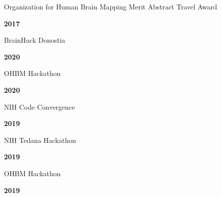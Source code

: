 \documentclass[10pt]{article}
\newcommand{\sectionstyle}{\LARGE \fontfamily{lmr}\selectfont}
\begin{document}
\begin{minipage}[t]{.85\linewidth}
\flushleft
\noindent
Organization for Human Brain Mapping Merit Abstract Travel Award
\end{minipage}
\hfill
\begin{minipage}[t]{.15\linewidth}
\flushright
\noindent
\textsc{\textbf{2017}}
\end{minipage}

\bigskip

\begin{center}\sectionstyle{HACKATHONS}\end{center}

\begin{minipage}[t]{.85\linewidth}
\flushleft
\noindent
BrainHack Donostia
\end{minipage}
\hfill
\begin{minipage}[t]{.15\linewidth}
\flushright
\noindent
\textsc{\textbf{2020}}
\end{minipage}

\begin{minipage}[t]{.85\linewidth}
\flushleft
\noindent
OHBM Hackathon
\end{minipage}
\hfill
\begin{minipage}[t]{.15\linewidth}
\flushright
\noindent
\textsc{\textbf{2020}}
\end{minipage}

\begin{minipage}[t]{.85\linewidth}
\flushleft
\noindent
NIH Code Convergence
\end{minipage}
\hfill
\begin{minipage}[t]{.15\linewidth}
\flushright
\noindent
\textsc{\textbf{2019}}
\end{minipage}

\begin{minipage}[t]{.85\linewidth}
\flushleft
\noindent
NIH Tedana Hackathon
\end{minipage}
\hfill
\begin{minipage}[t]{.15\linewidth}
\flushright
\noindent
\textsc{\textbf{2019}}
\end{minipage}

\begin{minipage}[t]{.85\linewidth}
\flushleft
\noindent
OHBM Hackathon
\end{minipage}
\hfill
\begin{minipage}[t]{.15\linewidth}
\flushright
\noindent
\textsc{\textbf{2019}}
\end{minipage}
\end{document}
